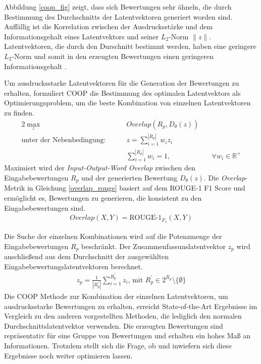 Abbildung \ref{coop_fig} zeigt, dass sich Bewertungen sehr ähneln, die durch Bestimmung des Durchschnitts der Latentvektoren generiert worden sind. 
Auffällig ist die Korrelation zwischen der Ausdrucksstärke und dem Informationsgehalt eines Latentvektors und seiner $L_2$-Norm $\| z \|$.
Latentvektoren, die durch den Durschnitt bestimmt werden, haben eine geringere $L_2$-Norm und somit in den erzeugten Bewertungen einen geringeren Informationsgehalt \citep{coop}.

Um ausdrucksstarke Latentvektoren für die Generation der Bewertungen zu erhalten, formuliert COOP \citep{coop} die Bestimmung des optimalen Latentvektors als Optimierungsproblem, um die beste Kombination von einzelnen Latentvektoren zu finden.
\begin{alignat*}{2}
    \max_z              &\quad&  Overlap(R_p, D_\theta(z))    & \\
    \text{unter der Nebenbedingung: } &\quad&  z = \sum_{i=1}^{|R_p|} w_i z_i \\
                         &\quad&  \sum_{i=1}^{|R_p|}w_i=1,                        &\quad \forall w_i \in \mathbb{R}^+
\end{alignat*}
Maximiert wird der \textit{Input-Output-Word Overlap} zwischen den Eingabebewertungen $R_p$ und der generierten Bewertung $D_\theta(z)$. 
Die \textit{Overlap}-Metrik in Gleichung \ref{overlap_rouge} basiert auf dem ROUGE-1 F1 Score und ermöglicht es, Bewertungen zu generieren, die konsistent zu den Eingabebewertungen sind.
\begin{align}
    \label{overlap_rouge}
    Overlap(X,Y) = \text{ROUGE-1}_{F_1}(X,Y)
\end{align}

Die Suche der einzelnen Kombinationen wird auf die Potenzmenge der Eingabebewertungen $R_p$ beschränkt. 
Der Zusammenfassunslatentvektor $z_p$ wird anschließend aus dem Durchschnitt der ausgewählten Eingabebewertungslatentvektoren berechnet.
\begin{align}
z_p = \frac{1}{|R_p^{'}|} \sum_{i=1}^{R_p^{'}}z_i \text{, mit } R_p^{'} \in 2^{R_p} \setminus  \{ \emptyset\}
\end{align}
Die COOP Methode zur Kombination der einzelnen Latentvektoren, um ausdrucksstarke Bewertungen zu erhalten, erreicht State-of-the-Art Ergebnisse im Vergleich zu den anderen vorgestellten Methoden, die lediglich den normalen Durchschnittslatentvektor verwenden.
Die erzeugten Bewertungen sind repräsentativ für eine Gruppe von Bewertungen und erhalten ein hohes Maß an Informationen. 
Trotzdem stellt sich die Frage, ob und inwiefern sich diese Ergebnisse noch weiter optimieren lassen.

